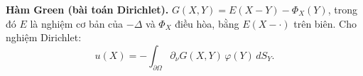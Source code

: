 \textbf{Hàm Green (bài toán Dirichlet).}
$G(X,Y)=E(X-Y)-\Phi_X(Y)$, trong đó $E$ là nghiệm cơ bản của $-\Delta$ và $\Phi_X$ điều hòa, bằng $E(X-\cdot)$ trên biên. Cho nghiệm Dirichlet:
\[
  u(X)=-\int_{\partial\Omega}\partial_\nu G(X,Y)\,\varphi(Y)\,dS_Y.
\]

